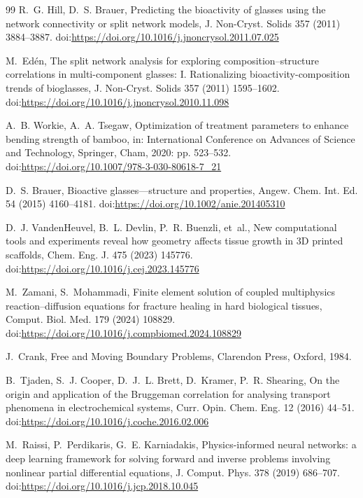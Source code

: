 \documentclass[11pt]{article}
\begin{document}
\begin{thebibliography}{99}
R.~G. Hill, D.~S. Brauer, Predicting the bioactivity of glasses using the network connectivity or split network models, J. Non-Cryst. Solids 357 (2011) 3884--3887.
\newblock doi:\url{https://doi.org/10.1016/j.jnoncrysol.2011.07.025}


M.~Ed\'en, The split network analysis for exploring composition--structure correlations in multi-component glasses: I. Rationalizing bioactivity-composition trends of bioglasses, J. Non-Cryst. Solids 357 (2011) 1595--1602.
\newblock doi:\url{https://doi.org/10.1016/j.jnoncrysol.2010.11.098}

A.~B. Workie, A.~A. Tsegaw, Optimization of treatment parameters to enhance bending strength of bamboo, in: International Conference on Advances of Science and Technology, Springer, Cham, 2020: pp. 523--532.
\newblock doi:\url{https://doi.org/10.1007/978-3-030-80618-7_21}

D.~S. Brauer, Bioactive glasses---structure and properties, Angew. Chem. Int. Ed. 54 (2015) 4160--4181.
\newblock doi:\url{https://doi.org/10.1002/anie.201405310}


D.~J. VandenHeuvel, B.~L. Devlin, P.~R. Buenzli, et~al., New computational tools and experiments reveal how geometry affects tissue growth in 3D printed scaffolds, Chem. Eng. J. 475 (2023) 145776.
\newblock doi:\url{https://doi.org/10.1016/j.cej.2023.145776}


M.~Zamani, S.~Mohammadi, Finite element solution of coupled multiphysics reaction--diffusion equations for fracture healing in hard biological tissues, Comput. Biol. Med. 179 (2024) 108829.
\newblock doi:\url{https://doi.org/10.1016/j.compbiomed.2024.108829}


J.~Crank, Free and Moving Boundary Problems, Clarendon Press, Oxford, 1984.


B.~Tjaden, S.~J. Cooper, D.~J.~L. Brett, D.~Kramer, P.~R. Shearing, On the origin and application of the Bruggeman correlation for analysing transport phenomena in electrochemical systems, Curr. Opin. Chem. Eng. 12 (2016) 44--51.
\newblock doi:\url{https://doi.org/10.1016/j.coche.2016.02.006}


M.~Raissi, P.~Perdikaris, G.~E. Karniadakis, Physics-informed neural networks: a deep learning framework for solving forward and inverse problems involving nonlinear partial differential equations, J. Comput. Phys. 378 (2019) 686--707.
\newblock doi:\url{https://doi.org/10.1016/j.jcp.2018.10.045}



\end{thebibliography}
\end{document}
